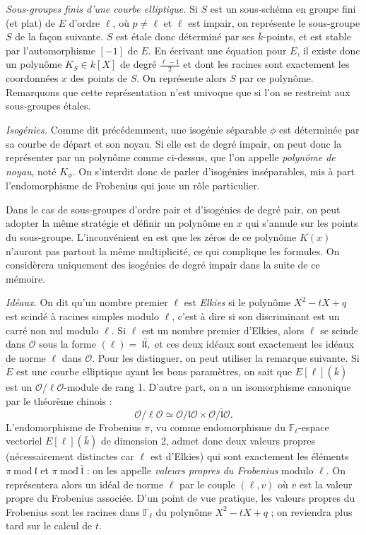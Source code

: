 \documentclass[11pt,a4paper]{article}
\newcommand{\F}{\mathbb{F}}
\renewcommand{\O}{\mathcal{O}}
\renewcommand{\frak}{\mathfrak}
\renewcommand{\mod}{\ \mathrm{mod}\ }
\renewcommand{\v}{\vspace{5mm}}
\theoremstyle{definition}
\begin{document}
\emph{Sous-groupes finis d'une courbe elliptique.} Si $S$ est un sous-schéma en groupe fini (et plat) de $E$ d'ordre $\ell$, où $p\neq \ell$ et $\ell$ est impair, on représente le sous-groupe $S$ de la façon suivante. $S$ est étale donc déterminé par ses $\bar{k}$-points, et est stable par l'automorphisme $[-1]$ de $E$.
En écrivant une équation pour $E$, il existe donc un polynôme $K_S\in k[X]$ de degré $\frac{\ell-1}{2}$ et dont les racines sont exactement les coordonnées $x$ des points de $S$. On représente alors $S$ par ce polynôme. Remarquons que cette représentation n'est univoque que si l'on se restreint aux sous-groupes étales.
\v

\emph{Isogénies.} Comme dit précédemment, une isogénie séparable $\phi$ est déterminée par sa courbe de départ et son noyau. Si elle est de degré impair, on peut donc la représenter par un polynôme comme ci-dessus, que l'on appelle \emph{polynôme de noyau}, noté $K_\phi$. On s'interdit donc de parler d'isogénies inséparables, mis à part l'endomorphisme de Frobenius qui joue un rôle particulier.

Dans le cas de sous-groupes d'ordre pair et d'isogénies de degré pair, on peut adopter la même stratégie et définir un polynôme en $x$ qui s'annule sur les points du sous-groupe. L'inconvénient en est que les zéros de ce polynôme $K(x)$ n'auront pas partout la même multiplicité, ce qui complique les formules. On considèrera uniquement des isogénies de degré impair dans la suite de ce mémoire.
\v

\emph{Idéaux.} On dit qu'un nombre premier $\ell$ est \emph{Elkies} si le polynôme $X^2 - tX + q$ est scindé à racines simples modulo $\ell$, c'est à dire si son discriminant est un carré non nul modulo $\ell$. Si $\ell$ est un nombre premier d'Elkies, alors $\ell$ se scinde dans $\O$ sous la forme $(\ell) =~\frak l \bar{\frak l},$
et ces deux idéaux sont exactement les idéaux de norme $\ell$ dans $\O$. Pour les distinguer, on peut utiliser la remarque suivante. Si $E$ est une courbe elliptique ayant les bons paramètres, on sait que $E[\ell](\bar{k})$ est un $\O/\ell\O$-module de rang 1. D'autre part, on a un isomorphisme canonique par le théorème chinois :
$$\O/\ell\O \simeq \O/\frak l \O \times \O/\bar{\frak l} \O.$$
L'endomorphisme de Frobenius $\pi$, vu comme endomorphisme du $\F_\ell$-espace vectoriel $E[\ell](\bar{k})$ de dimension 2, admet donc deux valeurs propres (nécessairement distinctes car $\ell$ est d'Elkies) qui sont exactement les éléments $\pi\mod \frak l$ et $\pi\mod \bar{\frak l}$ : on les appelle \emph{valeurs propres du Frobenius} modulo $\ell$. On représentera alors un idéal de norme $\ell$ par le couple $(\ell, v)$ où $v$ est la valeur propre du Frobenius associée. D'un point de vue pratique, les valeurs propres du Frobenius sont les racines dans $\F_\ell$ du polynôme $X^2 - tX + q$ ; on reviendra plus tard sur le calcul de $t$.
\v
\end{document}
